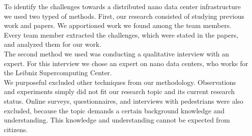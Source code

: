 
To identify the challenges towards a distributed nano data center infrastructure we used two typed of methods. First, our research consisted of studying previous work and papers. We apportioned work we found among the team members. Every team member extracted the challenges, which were stated in the papers, and analyzed them for our work. \\
The second method we used was conducting a qualitative interview with an expert. For this interview we chose an expert on nano data centers, who works for the Leibniz Supercomputing Center. \\
We purposeful excluded other techniques from our methodology. Observations and experiments simply did not fit our research topic and its current research status. Online surveys, questionnaires, and interviews with pedestrians were also excluded, because the topic demands a certain background knowledge and understanding. This knowledge and understanding cannot be expected from citizens. 